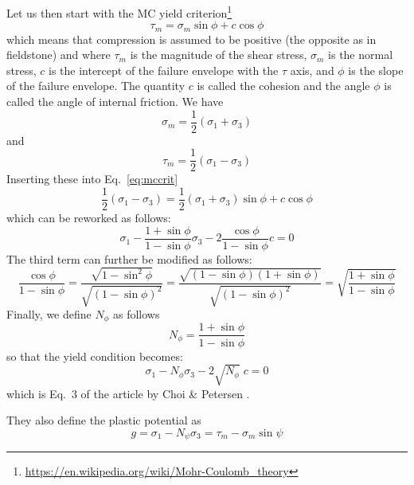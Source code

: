 Let us then start with the MC yield criterion\footnote{\url{https://en.wikipedia.org/wiki/Mohr-Coulomb_theory}}
\begin{equation}
\tau_m = \sigma_m \sin \phi + c \cos \phi  \label{eq:mccrit}
\end{equation}
which means that compression is assumed to be positive (the opposite as in fieldstone) and where $\tau_m$ is the magnitude of the shear stress, 
$\sigma_m$ is the normal stress, $c$ is the intercept of the failure envelope with the $\tau$ axis, 
and $\phi$ is the slope of the failure envelope. 
The quantity $c$ is called the cohesion and the angle $\phi$ is called the angle of internal friction.
We have
\[
\sigma_m=\frac{1}{2}(\sigma_1+\sigma_3) 
\]
and 
\[
\tau_m = \frac{1}{2}(\sigma_1-\sigma_3)
\]
Inserting these into Eq.~\eqref{eq:mccrit}
\begin{equation}
 \frac{1}{2}(\sigma_1-\sigma_3) = \frac{1}{2}(\sigma_1+\sigma_3)  \sin \phi + c \cos \phi 
\end{equation}
which can be reworked as follows:
\[
\sigma_1 - \frac{1 + \sin\phi}{1-\sin\phi} \sigma_3 - 2 \frac{\cos \phi}{1-\sin\phi} c = 0
\]
The third term can further be modified as follows:
\[
\frac{\cos \phi}{1-\sin\phi}
=\frac{\sqrt{1-\sin^2 \phi}}{\sqrt{(1-\sin\phi)^2}}
=\frac{\sqrt{(1-\sin \phi)(1+\sin\phi)}}{\sqrt{(1-\sin\phi)^2}}
=\sqrt{
\frac{1+\sin\phi}{1-\sin\phi}
}
\]
Finally, we define $N_\phi$ as follows 
\[
N_\phi=\frac{1+\sin \phi}{1-\sin\phi}
\]
so that the yield condition becomes:
\[
\sigma_1 - N_\phi \sigma_3 - 2 \sqrt{N_\phi} \; c = 0
\]
which is Eq.~3 of the article by Choi \& Petersen \cite{chpe15}.

They also define the plastic potential as 
\[
g=\sigma_1 -N_\psi \sigma_3  =\tau_m - \sigma_m \sin\psi
\]

